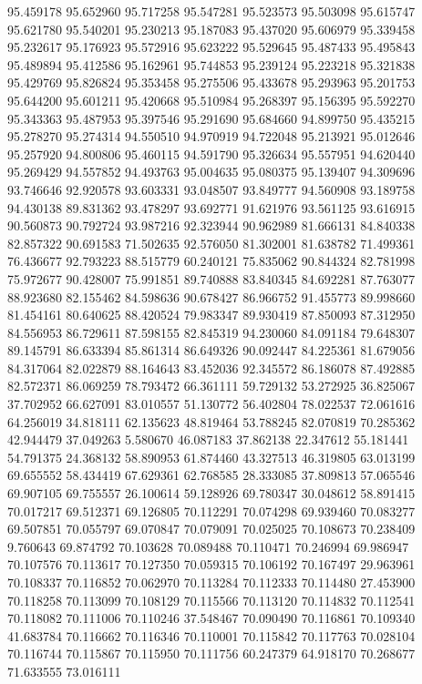 95.459178
95.652960
95.717258
95.547281
95.523573
95.503098
95.615747
95.621780
95.540201
95.230213
95.187083
95.437020
95.606979
95.339458
95.232617
95.176923
95.572916
95.623222
95.529645
95.487433
95.495843
95.489894
95.412586
95.162961
95.744853
95.239124
95.223218
95.321838
95.429769
95.826824
95.353458
95.275506
95.433678
95.293963
95.201753
95.644200
95.601211
95.420668
95.510984
95.268397
95.156395
95.592270
95.343363
95.487953
95.397546
95.291690
95.684660
94.899750
95.435215
95.278270
95.274314
94.550510
94.970919
94.722048
95.213921
95.012646
95.257920
94.800806
95.460115
94.591790
95.326634
95.557951
94.620440
95.269429
94.557852
94.493763
95.004635
95.080375
95.139407
94.309696
93.746646
92.920578
93.603331
93.048507
93.849777
94.560908
93.189758
94.430138
89.831362
93.478297
93.692771
91.621976
93.561125
93.616915
90.560873
90.792724
93.987216
92.323944
90.962989
81.666131
84.840338
82.857322
90.691583
71.502635
92.576050
81.302001
81.638782
71.499361
76.436677
92.793223
88.515779
60.240121
75.835062
90.844324
82.781998
75.972677
90.428007
75.991851
89.740888
83.840345
84.692281
87.763077
88.923680
82.155462
84.598636
90.678427
86.966752
91.455773
89.998660
81.454161
80.640625
88.420524
79.983347
89.930419
87.850093
87.312950
84.556953
86.729611
87.598155
82.845319
94.230060
84.091184
79.648307
89.145791
86.633394
85.861314
86.649326
90.092447
84.225361
81.679056
84.317064
82.022879
88.164643
83.452036
92.345572
86.186078
87.492885
82.572371
86.069259
78.793472
66.361111
59.729132
53.272925
36.825067
37.702952
66.627091
83.010557
51.130772
56.402804
78.022537
72.061616
64.256019
34.818111
62.135623
48.819464
53.788245
82.070819
70.285362
42.944479
37.049263
5.580670
46.087183
37.862138
22.347612
55.181441
54.791375
24.368132
58.890953
61.874460
43.327513
46.319805
63.013199
69.655552
58.434419
67.629361
62.768585
28.333085
37.809813
57.065546
69.907105
69.755557
26.100614
59.128926
69.780347
30.048612
58.891415
70.017217
69.512371
69.126805
70.112291
70.074298
69.939460
70.083277
69.507851
70.055797
69.070847
70.079091
70.025025
70.108673
70.238409
9.760643
69.874792
70.103628
70.089488
70.110471
70.246994
69.986947
70.107576
70.113617
70.127350
70.059315
70.106192
70.167497
29.963961
70.108337
70.116852
70.062970
70.113284
70.112333
70.114480
27.453900
70.118258
70.113099
70.108129
70.115566
70.113120
70.114832
70.112541
70.118082
70.111006
70.110246
37.548467
70.090490
70.116861
70.109340
41.683784
70.116662
70.116346
70.110001
70.115842
70.117763
70.028104
70.116744
70.115867
70.115950
70.111756
60.247379
64.918170
70.268677
71.633555
73.016111
